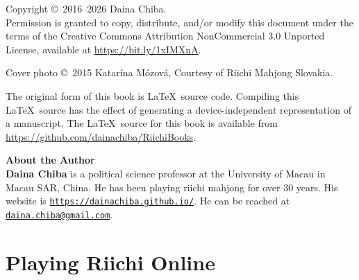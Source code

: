 \documentclass{book}
\begin{document}
\pagebreak
\thispagestyle{empty}

\noindent
{\small
Copyright \copyright ~2016--2026 Daina Chiba.\\
Permission is granted to copy, distribute, and/or modify this document
under the terms of the Creative Commons Attribution NonCommercial 3.0 Unported License, available at \url{https://bit.ly/1xIMXnA}.

\vspace{.2in}
\noindent
Cover photo \copyright ~2015 Katar\'{i}na M\'{o}zov\'{a}, Courtesy of Riichi Mahjong Slovakia. 

\vspace{.2in}

\noindent
The original form of this book is \LaTeX\ source code.  Compiling this
\LaTeX\ source has the effect of generating a device-independent
representation of a manuscript. The \LaTeX\ source for this book is available from 
\url{https://github.com/dainachiba/RiichiBooks}.

\vfill
\noindent
{\large\bf About the Author}\\

\noindent
{\bf Daina Chiba} is a political science professor at the University of Macau in Macau SAR, China. He has been playing riichi mahjong for over 30 years. His website is \href{https://dainachiba.github.io/}{\tt https://dainachiba.github.io/}. He can be reached at \href{mailto:daina.chiba@gmail.com}{\tt daina.chiba@gmail.com}.
} %


\pagebreak

\let\cleardoublepage\clearpage




{
	\tableofcontents
}

\newpage

\mainmatter


\part{Playing Riichi Online} \label{part:online}



\end{document}

